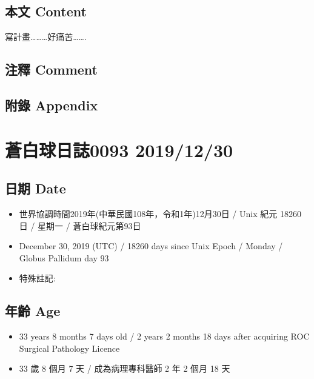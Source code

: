 \documentclass[a5paper, 12pt
]{book}
\providecommand{\tightlist}{%
  \setlength{\itemsep}{0pt}\setlength{\parskip}{0pt}}
\begin{document}
\hypertarget{ux672cux6587-content-28}{%
\subsection{本文 Content}\label{ux672cux6587-content-28}}

寫計畫\ldots\ldots\ldots 好痛苦\ldots\ldots.

\hypertarget{ux6ce8ux91cb-comment-27}{%
\subsection{注釋 Comment}\label{ux6ce8ux91cb-comment-27}}

\hypertarget{ux9644ux9304-appendix-28}{%
\subsection{附錄 Appendix}\label{ux9644ux9304-appendix-28}}

\hypertarget{ux84bcux767dux7403ux65e5ux8a8c0093-20191230}{%
\section{蒼白球日誌0093
2019/12/30}\label{ux84bcux767dux7403ux65e5ux8a8c0093-20191230}}

\hypertarget{ux65e5ux671f-date-29}{%
\subsection{日期 Date}\label{ux65e5ux671f-date-29}}

\begin{itemize}
\tightlist
\item
  世界協調時間2019年(中華民國108年，令和1年)12月30日 / Unix 紀元 18260
  日 / 星期一 / 蒼白球紀元第93日
\item
  December 30, 2019 (UTC) / 18260 days since Unix Epoch / Monday /
  Globus Pallidum day 93
\item
  特殊註記:
\end{itemize}

\hypertarget{ux5e74ux9f61-age-29}{%
\subsection{年齡 Age}\label{ux5e74ux9f61-age-29}}

\begin{itemize}
\tightlist
\item
  33 years 8 months 7 days old / 2 years 2 months 18 days after
  acquiring ROC Surgical Pathology Licence
\item
  33 歲 8 個月 7 天 / 成為病理專科醫師 2 年 2 個月 18 天
\end{itemize}
\end{document}
